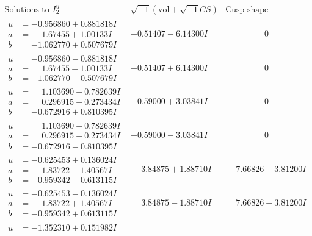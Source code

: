 \documentclass[1p]{elsarticle_modified}
\theoremstyle{definition}
\newcommand{\I}{\sqrt{-1}}
\begin{document}
$$\begin{array}{c|c|c}
\text{Solutions to }I^u_{2}& \I (\text{vol} + \sqrt{-1}CS) & \text{Cusp shape}\\
 \hline 
\begin{aligned}
u &= -0.956860 + 0.881818 I \\
a &= \phantom{-}1.67455 + 1.00133 I \\
b &= -1.062770 + 0.507679 I\end{aligned}
 & -0.51407 - 6.14300 I & \phantom{-0.000000 } 0 \\ \hline\begin{aligned}
u &= -0.956860 - 0.881818 I \\
a &= \phantom{-}1.67455 - 1.00133 I \\
b &= -1.062770 - 0.507679 I\end{aligned}
 & -0.51407 + 6.14300 I & \phantom{-0.000000 } 0 \\ \hline\begin{aligned}
u &= \phantom{-}1.103690 + 0.782639 I \\
a &= \phantom{-}0.296915 - 0.273434 I \\
b &= -0.672916 + 0.810395 I\end{aligned}
 & -0.59000 + 3.03841 I & \phantom{-0.000000 } 0 \\ \hline\begin{aligned}
u &= \phantom{-}1.103690 - 0.782639 I \\
a &= \phantom{-}0.296915 + 0.273434 I \\
b &= -0.672916 - 0.810395 I\end{aligned}
 & -0.59000 - 3.03841 I & \phantom{-0.000000 } 0 \\ \hline\begin{aligned}
u &= -0.625453 + 0.136024 I \\
a &= \phantom{-}1.83722 - 1.40567 I \\
b &= -0.959342 - 0.613115 I\end{aligned}
 & \phantom{-}3.84875 + 1.88710 I & \phantom{-}7.66826 - 3.81200 I \\ \hline\begin{aligned}
u &= -0.625453 - 0.136024 I \\
a &= \phantom{-}1.83722 + 1.40567 I \\
b &= -0.959342 + 0.613115 I\end{aligned}
 & \phantom{-}3.84875 - 1.88710 I & \phantom{-}7.66826 + 3.81200 I \\ \hline\begin{aligned}
u &= -1.352310 + 0.151982 I \\

\end{aligned}
\end{array}$$
\end{document}
